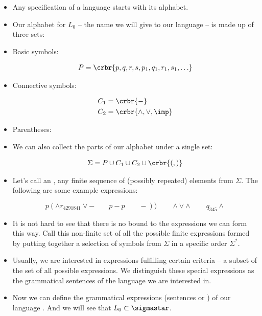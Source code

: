 \documentclass[11pt]{article}
\begin{document}
\begin{itemize}
\item Any specification of a language starts with its alphabet.
\item[] Our alphabet for $L_0$ -- the name we will give to our language -- is made up of three sets:

\item[] Basic symbols:

\begin{align}
	P = \crbr{p,q,r,s,p_1,q_1,r_1,s_1,\ldots}
\end{align} 

\item[] Connective symbols:
 
\begin{align}
	C_1 &= \crbr{-} \\
 	C_2 &= \crbr{\land,\lor,\imp}
\end{align} 

\item[] Parentheses: \sysm{\crbr{(,)}}

\item We can also collect the parts of our alphabet under a single set:

\begin{align}
\Sigma = P \cup C_1 \cup C_2 \cup \crbr{(,)}
\end{align} 

\item Let's call an , any finite sequence of (possibly
repeated) elements from $\Sigma$. The following are some example expressions:

\[
p(\land r_{4291841}\lor-\quad\quad p-p \quad\quad   -))  \quad\quad \land\lor\land \quad\quad q_{345}\land
\]

\item It is not hard to see that there is no bound to the expressions we can
form this way. Call this non-finite set of all the possible finite expressions
formed by putting together a selection of symbols from $\Sigma$ in a specific
order $\Sigma^*$.

\item Usually, we are interested in expressions fulfilling certain
criteria -- a subset of the set of all possible expressions. We distinguish
these special expressions as the grammatical sentences of the language we are
interested in.  

\item Now we can define the grammatical expressions (sentences or )
of our language . And we will see
that $L_0 \subset \sigmastar$.


\end{itemize}
\end{document}
